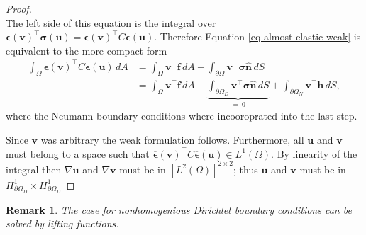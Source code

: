 \documentclass[11pt,a4paper,english]{elsarticle}%
\newtheorem*{remark}{Remark}
\begin{document}
\begin{proof}
\begin{equation}
\end{equation}
The left side of this equation is the integral over $\boldsymbol{\overline \epsilon}(\boldsymbol v)^\intercal \boldsymbol{\overline \sigma}(\boldsymbol u) = \boldsymbol{\overline \epsilon}(\boldsymbol v)^\intercal C\boldsymbol{\overline \epsilon}(\boldsymbol u)$. Therefore Equation \eqref{eq-almost-elastic-weak} is equivalent to the more compact form
\begin{align}
    \int_\Omega{ \boldsymbol{\overline \epsilon}(\boldsymbol v)^\intercal C\boldsymbol{\overline \epsilon}(\boldsymbol u)} \,dA  &=\int_\Omega{\boldsymbol{v}^\intercal \boldsymbol{f}} \,dA + \int_{\partial \Omega}{\boldsymbol{v}^\intercal \boldsymbol{\sigma}}\boldsymbol{\hat{n} } \,dS  \\
    &= \int_\Omega{\boldsymbol{v}^\intercal \boldsymbol{f}} \,dA + \underbrace{\int_{\partial \Omega_D}{\boldsymbol{v}^\intercal \boldsymbol{\sigma}}\boldsymbol{\hat{n} } \,dS}_{= \ 0} + \int_{\partial \Omega_N}{\boldsymbol{v}^\intercal \boldsymbol h} \,dS,
\end{align}
where the Neumann boundary conditions where incooroprated into the last step.

Since $\bm v$ was arbitrary the weak formulation follows. Furthermore, all $\bm u$ and $\bm v$ must belong to a space such that $\boldsymbol{\overline \epsilon}(\boldsymbol v)^\intercal C\boldsymbol{\overline \epsilon}(\boldsymbol u) \in {L^1}(\Omega)$. By linearity of the integral then $\nabla \bm u$ and $\nabla \bm v$ must be in $\left[{L^2}(\Omega)\right]^{2 \times 2}$; thus $\bm u$ and $\bm v$ must be in $ H^1_{\partial \Omega_D } \times H^1_{\partial \Omega_D } $
\end{proof}
\begin{remark}
    The case for nonhomogenious Dirichlet boundary conditions can be solved by lifting functions.
\end{remark}
\end{document}
